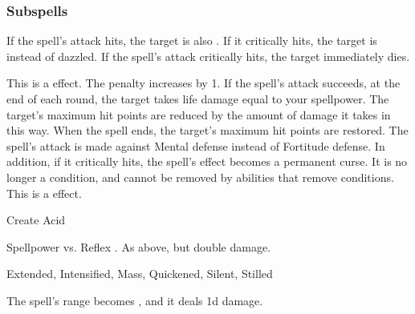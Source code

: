 \subsubsection{Subspells}
If the spell's attack hits, the target is also \dazzled. If it critically hits, the target is \blinded instead of dazzled.
If the spell's attack critically hits, the target immediately dies.
\par
This is a  effect.
The penalty increases by 1.
If the spell's attack succeeds, at the end of each round, the target takes life damage equal to your spellpower.
The target's maximum hit points are reduced by the amount of damage it takes in this way.
When the spell ends, the target's maximum hit points are restored.
The spell's attack is made against Mental defense instead of Fortitude defense.
In addition, if it critically hits, the spell's effect becomes a permanent curse.
It is no longer a condition, and cannot be removed by abilities that remove conditions.
This is a  effect.
\begin{spellsection}{Create Acid}
\begin{spellheader}
\end{spellheader}
\begin{spellcontent}
\begin{spelltargetinginfo}
\end{spelltargetinginfo}
\begin{spelleffects}
\begin{spellattack}{Spellpower vs. Reflex}
\spellsuccess {}.
\spellcritical As above, but double damage.
\end{spellattack}
\end{spelleffects}
\end{spellcontent}
\begin{spellfooter}
 Extended, Intensified, Mass, Quickened, Silent, Stilled
\end{spellfooter}
\begin{spellsubcontent}
\begin{spellcantrip}
The spell's range becomes \rngclose, and it deals \minus1d damage.
\end{spellcantrip}
\end{spellsubcontent}
\end{spellsection}
